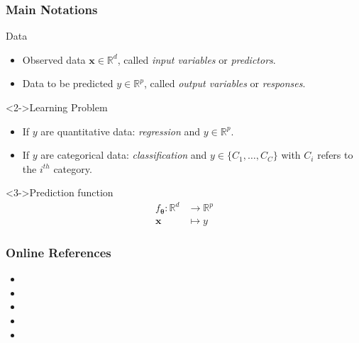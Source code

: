 \documentclass[pressentation,10pt,aspectratio=169,xcolor=table, colorlinks=true]{beamer}
\begin{document}
\begin{frame}
  \frametitle{Main Notations}
  \begin{block}{Data}
    \begin{itemize}
    \item Observed data \(\mathbf{x}\in \mathbb{R}^d\), called \emph{input variables} or \emph{predictors}.
    \item Data to be predicted \(y\in \mathbb{R}^p\), called \emph{output variables} or \emph{responses}.
    \end{itemize}
  \end{block}

  \begin{block}<2->{Learning Problem}
    \begin{itemize}
    \item If \(y\) are quantitative data: \emph{regression} and \(y\in\mathbb{R}^p\).
    \item If \(y\) are categorical data:  \emph{classification} and \(y\in\{C_1, \ldots, C_C\}\) with \(C_i\) refers to the \(i^{th}\) category.
    \end{itemize}
  \end{block}

  \begin{block}<3->{Prediction function}
    \begin{align*}
      f_{\boldsymbol{\theta}}: \mathbb{R}^d & \to  \mathbb{R}^p\\
      \mathbf{x} &  \mapsto  y
    \end{align*}
  \end{block}
\end{frame}

\begin{frame}
  \frametitle{Online References}

  \begin{itemize}
  \item {}
    
  \item {}

  \item {}

  \item {}

  \item {}
  \end{itemize}
  
\end{frame}
\end{document}
